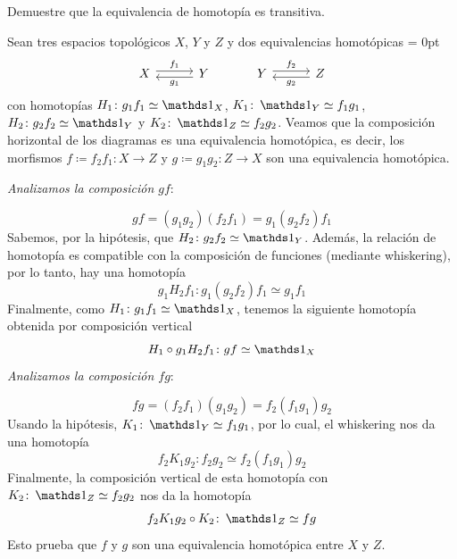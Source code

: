 \begin{ejer}
Demuestre que la equivalencia de homotopía es transitiva.
\end{ejer}
\begin{sol}[Demostración]
Sean tres espacios topológicos $X$, $Y$ y $Z$ y dos equivalencias homotópicas
{\mathsurround = 0pt
\[\begin{tikzcd}[column sep = 1.5em]
	X && Y && Y && Z
	\arrow["{f_1}", shift left, from=1-1, to=1-3]
	\arrow["{g_1}", shift left, from=1-3, to=1-1]
	\arrow["{f_2}", shift left, from=1-5, to=1-7]
	\arrow["{g_2}", shift left, from=1-7, to=1-5]
\end{tikzcd}\]
}
con homotopías $H_1 \colon g_1f_1 \simeq \id_X$, $K_1 \colon \id_Y \simeq f_1g_1$, $H_2 \colon g_2f_2 \simeq \id_Y$ y $K_2 \colon \id_Z \simeq f_2g_2$. Veamos que la composición horizontal de los diagramas es una equivalencia homotópica, es decir, los morfismos
\(
f \coloneq f_2f_1 \colon X \to Z
\) y \(
g \coloneq g_1g_2 \colon Z \to X
\)
son una equivalencia homotópica.\par
\vspace{1em}
\emph{Analizamos la composición $gf$}:

\[
g f = (g_1 g_2) (f_2 f_1) = g_1 (g_2 f_2) f_1
\]
Sabemos, por la hipótesis, que $H_2 \colon g_2 f_2 \simeq \id_Y$. Además, la relación de homotopía es compatible con la composición de funciones (mediante whiskering), por lo tanto, hay una homotopía
\[
g_1H_2f_1 \colon g_1 (g_2 f_2) f_1 \simeq g_1 f_1
\]
Finalmente, como $H_1\colon g_1 f_1 \simeq \id_X$, tenemos la siguiente homotopía obtenida por composición vertical
\[
H_1 \circ g_1H_2f_1 \colon gf \simeq \id_X
\]
\vspace{1em}
\emph{Analizamos la composición $fg$}:

\[
fg = (f_2f_1) (g_1 g_2) = f_2 (f_1 g_1) g_2
\]
Usando la hipótesis, $K_1 \colon \id_Y \simeq f_1g_1$, por lo cual, el whiskering nos da una homotopía
\[
f_2K_1g_2 \colon f_2g_2 \simeq f_2(f_1 g_1)g_2
\]
Finalmente, la composición vertical de esta homotopía con $K_2 \colon \id_Z \simeq f_2g_2$ nos da la homotopía
\[
f_2K_1g_2 \circ K_2 \colon \id_Z \simeq fg
\]
Esto prueba que $f$ y $g$ son una equivalencia homotópica entre $X$ y $Z$.
\end{sol}

